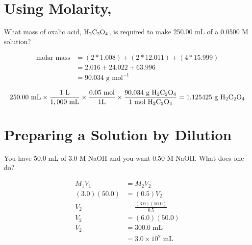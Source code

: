 \documentclass{chem122notes}
\begin{document}
\section{Using Molarity, }
What mass of oxalic acid, $\chemical{H}[2]\chemical{C}[2]\chemical{O}[4]$, is required to make 250.00 mL of a 0.0500 M solution?

\begin{equation*}
\begin{aligned}
	\mbox{molar mass} &= (2*1.008) + (2*12.011) + (4 * 15.999)\\
			  &= 2.016 + 24.022 + 63.996\\
			  &= 90.034 \mbox{ g mol}^{-1}\\
\end{aligned}
\end{equation*}
\begin{equation*}
\begin{aligned}
	250.00 \mbox{ mL} \times \frac{1 \mbox{ L}}{1,000 \mbox{ mL}} \times \frac{0.05 \mbox{ mol}}{1 \mbox{L}} \times \frac{90.034 \mbox{ g }\chemical{H}[2]\chemical{C}[2]\chemical{O}[4]}{1 \mbox{ mol } \chemical{H}[2]\chemical{C}[2]\chemical{O}[4]} = 1.125425 \mbox{ g }\chemical{H}[2]\chemical{C}[2]\chemical{O}[4]\\
\end{aligned}
\end{equation*}

\section{Preparing a Solution by Dilution}\label{sec:preparing-a-solution-by-dilution}
You have 50.0 mL of 3.0 M NaOH and you want 0.50 M NaOH\@.
What does one do?

\begin{equation*}
\begin{aligned}
	M_{1}V_{1} &= M_{2}V_{2}\\
	(3.0)(50.0) &= (0.5)V_{2}\\
	V_{2} &= \frac{(3.0)(50.0)}{0.5}\\
	V_{2} &= (6.0)(50.0)\\
	V_{2} &= 300.0\mbox{ mL}\\
		  &= 3.0\times10^{2}\mbox{ mL}
\end{aligned}
\end{equation*}
\end{document}
